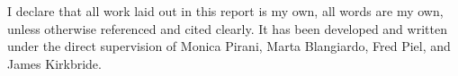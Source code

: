 
\begin{Statement of Originality}

I declare that all work laid out in this report is my own, all words are my own, unless otherwise referenced and cited clearly. It has been developed and written under the direct supervision of Monica Pirani, Marta Blangiardo, Fred Piel, and James Kirkbride. 

\end{Statement of Originality}
